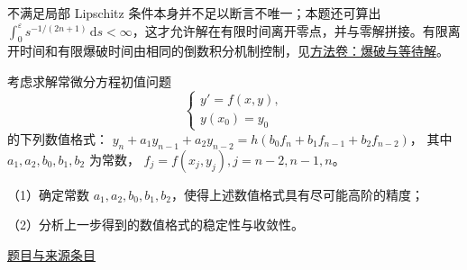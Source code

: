 \documentclass[UTF8,12pt,a4paper,fontset=fandol]{ctexart}
\begin{document}
\begin{remark}[方法与条件]不满足局部 Lipschitz 条件本身并不足以断言不唯一；本题还可算出 $\int_0^\varepsilon s^{-1/(2n+1)}\,\mathrm ds<\infty$，这才允许解在有限时间离开零点，并与零解拼接。有限离开时间和有限爆破时间由相同的倒数积分机制控制，见\hyperref[app:dynamics-blowup]{方法卷：爆破与等待解}。\end{remark}

\begin{example}\label{ex:fin12-high:13}\label{pr:fin12-high:13}

考虑求解常微分方程初值问题
\[
\begin{cases} y' = f(x,y), \\ y\left(x_0\right) = y_0 \end{cases}
\]
的下列数值格式：
$y_{n}+a_{1}y_{n-1}+a_{2}y_{n-2}=h\left(b_{0}f_{n}+b_{1}f_{n-1}+b_{2}f_{n-2}\right)$，
其中 $a_{1},a_{2},b_{0},b_{1},b_{2}$ 为常数，
$f_{j}=f\left(x_{j},y_{j}\right),j=n-2,n-1,n$。

（1）确定常数 $a_{1},a_{2},b_{0},b_{1},b_{2}$，使得上述数值格式具有尽可能高阶的精度；

（2）分析上一步得到的数值格式的稳定性与收敛性。

\par\href{https://github.com/lzxcr/cmc-mathematics/blob/64916fa1fdbc3e444a652eca204d5669058ee321/src/problems/finals/12/15.md}{题目与来源条目}

\end{example}
\end{document}
